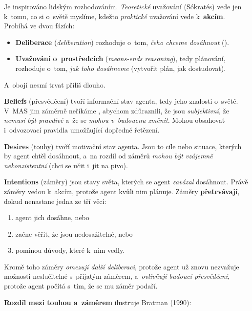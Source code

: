 \documentclass[11pt,a4paper]{article}
\theoremstyle{definition}
\begin{document}
\begin{defbox}
Je inspirováno lidským rozhodováním. \emph{Teoretické} uvažování (Sókratés) vede jen k~tomu,
co si o~světě myslíme, kdežto \emph{praktické} uvažování vede k~\textbf{akcím}. Probíhá ve
dvou fázích:
\begin{itemize}
\item \textbf{Deliberace} (\emph{deliberation}) rozhoduje o~tom, \emph{čeho chceme dosáhnout}
  ().
\item \textbf{Uvažování o~prostředcích} (\emph{means-ends reasoning}), tedy plánování, rozhoduje
  o~tom, \emph{jak toho dosáhneme} (vytvořit plán, jak dostudovat).
\end{itemize}
A~obojí nesmí trvat příliš dlouho.
\end{defbox}

\begin{defbox}
\textbf{Beliefs} (přesvědčení) tvoří informační stav agenta, tedy jeho znalosti o~světě.
V~MAS jim záměrně neříkáme , abychom zdůraznili, že jsou \emph{subjektivní},
že \emph{nemusí být pravdivé} a~že se \emph{mohou v~budoucnu změnit}. Mohou obsahovat
i~odvozovací pravidla umožňující dopředné řetězení.

\textbf{Desires} (touhy) tvoří motivační stav agenta. Jsou to cíle nebo situace, kterých by
agent chtěl dosáhnout, a~na rozdíl od záměrů \emph{mohou být vzájemně nekonzistentní}
(chci se učit i~jít na pivo).

\textbf{Intentions} (záměry) jsou stavy světa, kterých se agent \emph{zavázal} dosáhnout.
Právě záměry vedou k~akcím, protože agent kvůli nim plánuje. Záměry \textbf{přetrvávají},
dokud nenastane jedna ze tří věcí:
\begin{enumerate}
\item agent jich dosáhne, nebo
\item začne věřit, že jsou nedosažitelné, nebo
\item pominou důvody, které k~nim vedly.
\end{enumerate}
Kromě toho záměry \emph{omezují další deliberaci}, protože agent už znovu nezvažuje možnosti
neslučitelné s~přijatým záměrem, a~\emph{ovlivňují budoucí přesvědčení}, protože agent počítá
s~tím, že se mu záměr podaří.
\end{defbox}

\noindent\textbf{Rozdíl mezi touhou a~záměrem} ilustruje Bratman (1990):
\end{document}
